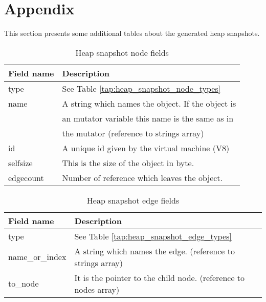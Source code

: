 \section{Appendix}

This section presents some additional tables about the generated heap snapshots.

\begin{table}[!htbp]
	\centering
	\begin{tabular}{|l||l|}
		\hline
		\textbf{Field name}	& \textbf{Description} 				\\ \hline \hline
		type & See Table \ref{tap:heap_snapshot_node_types}			\\ \hline
		name & A string which names the object. If the object is	\\
			 & an mutator variable this name is the same as in 		\\
			 & the mutator (reference to strings array)				\\ \hline	
		id	 & A unique id given by the virtual machine (V8)		\\ \hline
		selfsize  & This is the size of the object in byte. 		\\ \hline
		edgecount &	Number of reference which leaves the object.	\\ \hline	
	\end{tabular}
	\caption{Heap snapshot node fields}
	\label{tap:heap_snapshot_node_fields}
\end{table}
		
\begin{table}[!htbp]
	\centering
	\begin{tabular}{|l||l|}
		\hline
		\textbf{Field name}	&	\textbf{Description}			\\ \hline \hline
		type & See Table \ref{tap:heap_snapshot_edge_types}		\\ \hline
		name\_or\_index & A string which names the edge. 
							(reference to strings array)		\\	\hline
		to\_node		& It is the pointer to the child node. 
							(reference to nodes array)			\\	\hline 
	\end{tabular}
	\caption{Heap snapshot edge fields}
	\label{tap:heap_snapshot_edge_fields}
\end{table}
		
